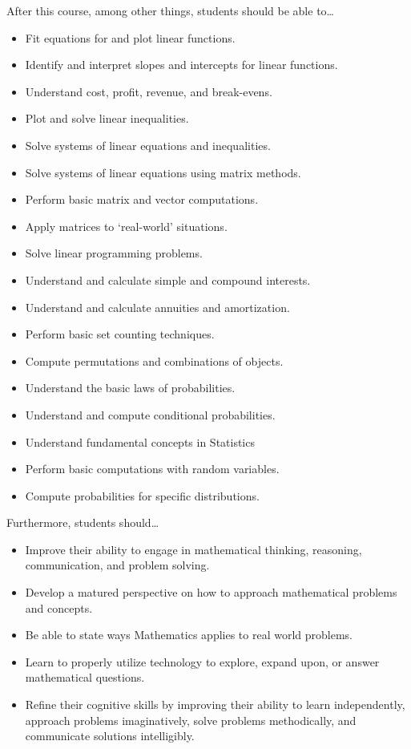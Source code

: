 \documentclass[11pt,letterpaper]{article}
\begin{document}
After this course, among other things, students should be able to\dots
	\begin{itemize} \itemsep=0.3ex
	\item Fit equations for and plot linear functions.
	\item Identify and interpret slopes and intercepts for linear functions.
	\item Understand cost, profit, revenue, and break-evens. 
	\item Plot and solve linear inequalities.
	\item Solve systems of linear equations and inequalities.
	\item Solve systems of linear equations using matrix methods.
	\item Perform basic matrix and vector computations.
	\item Apply matrices to `real-world' situations.
	\item Solve linear programming problems. 
	\item Understand and calculate simple and compound interests.
	\item Understand and calculate annuities and amortization. 
	\item Perform basic set counting techniques. 
	\item Compute permutations and combinations of objects. 
	\item Understand the basic laws of probabilities. 
	\item Understand and compute conditional probabilities. 
	\item Understand fundamental concepts in Statistics
	\item Perform basic computations with random variables.  
	\item Compute probabilities for specific distributions.  
	\end{itemize}
Furthermore, students should\dots
	\begin{itemize} \itemsep=0.3ex
	\item  Improve their ability to engage in mathematical thinking, reasoning, communication, and problem solving.
	\item Develop a matured perspective on how to approach mathematical problems and concepts.
	\item Be able to state ways Mathematics applies to real world problems.
	\item Learn to properly utilize technology to explore, expand upon, or answer mathematical questions.
	\item Refine their cognitive skills by improving their ability to learn independently, approach problems imaginatively, solve problems methodically, and communicate solutions intelligibly.
	\end{itemize}
\sectionbreak
\end{document}
